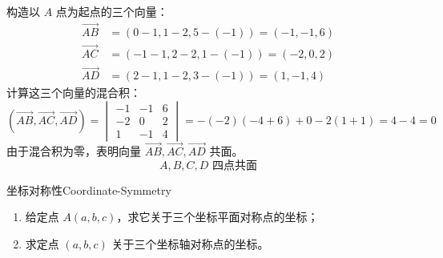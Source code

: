 \begin{solution}
    构造以 $A$ 点为起点的三个向量：
    \begin{equation*}
        \begin{aligned}
            \overrightarrow{AB} & = (0-1, 1-2, 5-(-1)) = (-1, -1, 6) \\
            \overrightarrow{AC} & = (-1-1, 2-2, 1-(-1)) = (-2, 0, 2) \\
            \overrightarrow{AD} & = (2-1, 1-2, 3-(-1)) = (1, -1, 4)
        \end{aligned}
    \end{equation*}
    计算这三个向量的混合积：
    \begin{equation*}
        (\overrightarrow{AB}, \overrightarrow{AC}, \overrightarrow{AD}) = \begin{vmatrix} -1 & -1 & 6 \\ -2 & 0 & 2 \\ 1 & -1 & 4 \end{vmatrix} = -(-2)(-4 + 6) + 0 - 2(1 + 1) = 4 - 4 = 0
    \end{equation*}
    由于混合积为零，表明向量 $\overrightarrow{AB}, \overrightarrow{AC}, \overrightarrow{AD}$ 共面。
    \begin{equation*}
        \boxed{A, B, C, D \text{ 四点共面}}
    \end{equation*}
\end{solution}

\begin{problem}{坐标对称性}{Coordinate-Symmetry}
    \begin{enumerate}
        \item 给定点 $A(a, b, c)$，求它关于三个坐标平面对称点的坐标；
        \item 求定点 $(a, b, c)$ 关于三个坐标轴对称点的坐标。
    \end{enumerate}
\end{problem}

